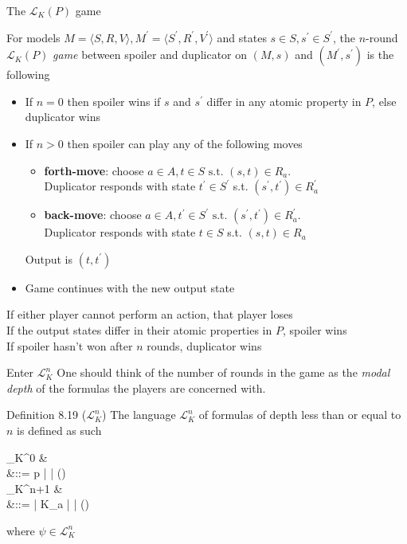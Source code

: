 \documentclass{beamer}
\newcommand{\lang}{\mathcal{L}}
\begin{document}
\begin{frame}{The $\lang_K(P)$ game}
	\begin{small}
	For models $M = \langle S,R,V \rangle, M^\prime = \langle S^\prime,R^\prime,V^\prime \rangle$ and states $s \in S, s^\prime \in S^\prime$, the $n$-round $\lang_K(P)$ \textit{game} between spoiler and duplicator on $(M,s)$ and $(M^\prime,s^\prime)$ is the following \pause
	\begin{itemize}
		\item If $n=0$ then spoiler wins if $s$ and $s^\prime$ differ in any atomic property in $P$, else duplicator wins \pause
		\item If $n>0$ then spoiler can play any of the following moves
			\begin{itemize}
				\item \textbf{forth-move}: choose $a \in A, t \in S \text{ s.t. } (s,t) \in R_a$.\\
				Duplicator responds with state $t^\prime \in S^\prime$ s.t. $(s^\prime,t^\prime) \in R_a^\prime$
				\item \textbf{back-move}: choose $a \in A, t^\prime \in S^\prime \text{ s.t. } (s^\prime,t^\prime) \in R_a^\prime$.\\
				Duplicator responds with state $t \in S$ s.t. $(s,t) \in R_a$
			\end{itemize}
			Output is $(t,t^\prime)$ \pause
		\item Game continues with the new output state
	\end{itemize} \pause
	If either player cannot perform an action, that player loses\\
	If the output states differ in their atomic properties in $P$, spoiler wins\\
	If spoiler hasn't won after $n$ rounds, duplicator wins
	\end{small}
\end{frame}

\begin{frame}{Enter $\lang_K^n$}
	One should think of the number of rounds in the game as the \textit{modal depth} of the formulas the players are concerned with. \pause
	\begin{block}{Definition 8.19 ($\lang_K^n$)}
		The language $\lang_K^n$ of formulas of depth less than or equal to $n$ is defined as such
		\begin{flalign*}
			\lang_K^0 &\\
				&\phi ::= p | \neg \phi | \left(\phi \wedge \phi\right)\\
			\lang_K^{n+1} &\\
				&\phi ::= \psi | K_a \psi | \neg \phi | \left(\phi \wedge \phi\right)
		\end{flalign*}
		where $\psi \in \lang_K^n$
	\end{block}
\end{frame}
\end{document}
